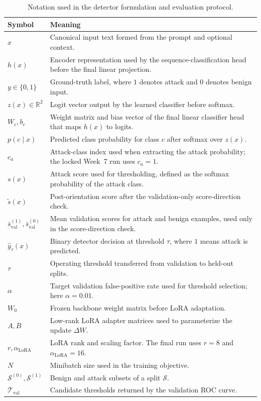 \begin{table}[t]
\centering
\caption{Notation used in the detector formulation and evaluation protocol.}
\label{tab:notation}
\small
\begin{tabularx}{\textwidth}{>{\raggedright\arraybackslash}p{}X}
\toprule
Symbol & Meaning \\
\midrule
$x$ & Canonical input text formed from the prompt and optional context. \\
$h(x)$ & Encoder representation used by the sequence-classification head before the final linear projection. \\
$y \in \{0,1\}$ & Ground-truth label, where $1$ denotes attack and $0$ denotes benign input. \\
$z(x) \in \mathbb{R}^2$ & Logit vector output by the learned classifier before softmax. \\
$W_c, b_c$ & Weight matrix and bias vector of the final linear classifier head that maps $h(x)$ to logits. \\
$p(c \mid x)$ & Predicted class probability for class $c$ after softmax over $z(x)$. \\
$c_a$ & Attack-class index used when extracting the attack probability; the locked Week~7 run uses $c_a=1$. \\
$s(x)$ & Attack score used for thresholding, defined as the softmax probability of the attack class. \\
$\tilde{s}(x)$ & Post-orientation score after the validation-only score-direction check. \\
$\bar{s}^{(1)}_{\mathrm{val}}, \bar{s}^{(0)}_{\mathrm{val}}$ & Mean validation scores for attack and benign examples, used only in the score-direction check. \\
$\hat{y}_{\tau}(x)$ & Binary detector decision at threshold $\tau$, where $1$ means attack is predicted. \\
$\tau$ & Operating threshold transferred from validation to held-out splits. \\
$\alpha$ & Target validation false-positive rate used for threshold selection; here $\alpha=0.01$. \\
$W_0$ & Frozen backbone weight matrix before LoRA adaptation. \\
$A, B$ & Low-rank LoRA adapter matrices used to parameterize the update $\Delta W$. \\
$r, \alpha_{\mathrm{LoRA}}$ & LoRA rank and scaling factor. The final run uses $r=8$ and $\alpha_{\mathrm{LoRA}}=16$. \\
$N$ & Minibatch size used in the training objective. \\
$\mathcal{S}^{(0)}, \mathcal{S}^{(1)}$ & Benign and attack subsets of a split $\mathcal{S}$. \\
$\mathcal{T}_{\mathrm{val}}$ & Candidate thresholds returned by the validation ROC curve. \\
\bottomrule
\end{tabularx}
\normalsize
\end{table}

